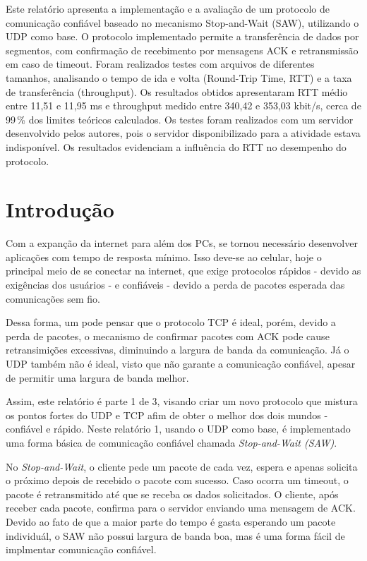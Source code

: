 \documentclass[11pt,a4paper]{article}
\begin{document}
\capa

\begin{resumo}
	Este relatório apresenta a implementação e a avaliação de um protocolo de comunicação confiável baseado no mecanismo Stop-and-Wait (SAW), 
	utilizando o UDP como base. 
	O protocolo implementado permite a transferência de dados por segmentos, com confirmação de recebimento por mensagens ACK e retransmissão em caso de timeout. 
	Foram realizados testes com arquivos de diferentes tamanhos, analisando o tempo de ida e volta (Round-Trip Time, RTT) e a taxa de transferência (throughput). 
	Os resultados obtidos apresentaram RTT médio entre 11,51 e 11,95 ms e throughput medido entre 340,42 e 353,03 kbit/s, cerca de 99\,\% dos limites teóricos calculados. 
	Os testes foram realizados com um servidor desenvolvido pelos autores, pois o servidor disponibilizado para a atividade estava indisponível. 
	Os resultados evidenciam a influência do RTT no desempenho do protocolo.
\end{resumo}

\section{Introdução}

Com a expanção da internet para além dos PCs, se tornou necessário desenvolver aplicações com tempo de resposta mínimo.
Isso deve-se ao celular, hoje o principal meio de se conectar na internet, que exige protocolos rápidos - devido as exigências dos usuários -
e confiáveis - devido a perda de pacotes esperada das comunicações sem fio.

Dessa forma, um pode pensar que o protocolo TCP é ideal, porém, devido a perda de pacotes, o mecanismo de confirmar pacotes com ACK
pode cause retransimições excessivas, diminuindo a largura de banda da comunicação. Já o UDP também não é ideal, visto que não garante
a comunicação confiável, apesar de permitir uma largura de banda melhor.

Assim, este relatório é parte 1 de 3, visando criar um novo protocolo que mistura os pontos fortes do UDP e TCP afim de obter
o melhor dos dois mundos - confiável e rápido. Neste relatório 1, usando o UDP como base, é implementado uma forma básica de 
comunicação confiável chamada \textit{Stop-and-Wait (SAW)}.

No \textit{Stop-and-Wait}, o cliente pede um pacote de cada vez, espera e apenas solicita o próximo depois de recebido o pacote com sucesso.
Caso ocorra um timeout, o pacote é retransmitido até que se receba os dados solicitados.
O cliente, após receber cada pacote, confirma para o servidor enviando uma mensagem de ACK. Devido ao fato de que a maior parte do tempo é 
gasta esperando um pacote individuál, o SAW não possui largura de banda boa, mas é uma forma fácil de implmentar comunicação confiável.
\end{document}
